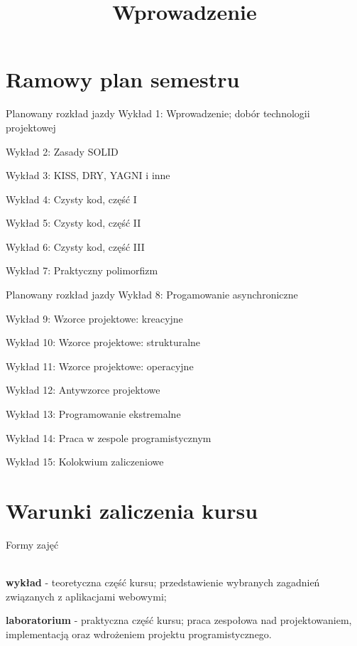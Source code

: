 

\title{Wprowadzenie}



\section{Ramowy plan semestru}

\begin{frame}{Planowany rozkład jazdy}
	Wykład 1: Wprowadzenie; dobór technologii projektowej
	
	Wykład 2: Zasady SOLID
	
	Wykład 3: KISS, DRY, YAGNI i inne
	
	Wykład 4: Czysty kod, część I
	
	Wykład 5: Czysty kod, część II
	
	Wykład 6: Czysty kod, część III
	
	Wykład 7: Praktyczny polimorfizm
\end{frame}

\begin{frame}{Planowany rozkład jazdy}
	Wykład 8: Progamowanie asynchroniczne
	
	Wykład 9: Wzorce projektowe: kreacyjne
	
	Wykład 10: Wzorce projektowe: strukturalne
	
	Wykład 11: Wzorce projektowe: operacyjne
	
	Wykład 12: Antywzorce projektowe
	
	Wykład 13: Programowanie ekstremalne
	
	Wykład 14: Praca w zespole programistycznym
	
	Wykład 15: Kolokwium zaliczeniowe
\end{frame}

\section{Warunki zaliczenia kursu}

\begin{frame}{Formy zajęć}
	\begin{figure}
	\end{figure}
	
	\ \\
	
	\textbf{wykład} - teoretyczna część kursu; przedstawienie wybranych zagadnień związanych z aplikacjami webowymi;
	
	\textbf{laboratorium} - praktyczna część kursu; praca zespołowa nad projektowaniem, implementacją oraz wdrożeniem projektu programistycznego.
\end{frame}

